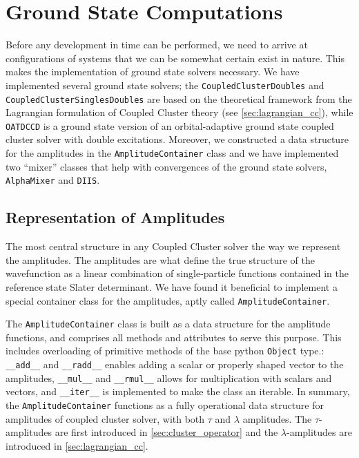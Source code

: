 \section{Ground State Computations}

    Before any development in time can be performed, we need to arrive at configurations 
    of systems that 
    we can be somewhat certain exist in nature. This makes the implementation of ground 
    state solvers necessary. We have implemented several ground state solvers; the
    \lstinline{CoupledClusterDoubles} and \lstinline{CoupledClusterSinglesDoubles} 
    are based on the theoretical framework from the Lagrangian formulation of Coupled 
    Cluster theory (see \autoref{sec:lagrangian_cc}),
    while \lstinline{OATDCCD} is a ground state version of an orbital-adaptive 
    ground state coupled cluster solver with double excitations. Moreover, we constructed 
    a data structure for the amplitudes in the \lstinline{AmplitudeContainer} class and 
    we have implemented two ``mixer'' classes that help with convergences of the ground
    state solvers, \lstinline{AlphaMixer} and \lstinline{DIIS}.

    \begin{figure}[h]
    
    \end{figure}

    \subsection{Representation of Amplitudes}

    The most central structure in any Coupled Cluster solver the way we represent
    the amplitudes. The 
    amplitudes are what define the true structure of the wavefunction as a linear 
    combination of single-particle functions contained in the reference state Slater 
    determinant. We have found it beneficial to implement a special container 
    class for the amplitudes, aptly called \lstinline{AmplitudeContainer}.

    The \lstinline{AmplitudeContainer} class is built as a data structure for 
    the amplitude functions, and comprises all methods and attributes to serve this 
    purpose. This includes overloading of primitive methods of the base 
    python \lstinline{Object} type.: \lstinline{__add__} and \lstinline{__radd__}
    enables adding a scalar or properly shaped vector to the amplitudes, 
    \lstinline{__mul__} and \lstinline{__rmul__} allows for multiplication 
    with scalars and vectors, and \lstinline{__iter__} is implemented to make 
    the class an iterable. In summary, the \lstinline{AmplitudeContainer} 
    functions as a fully operational data structure for amplitudes of coupled 
    cluster solver, with both $\tau$ and $\lambda$ amplitudes. The $\tau$-amplitudes
    are first introduced in \ref{sec:cluster_operator} and the $\lambda$-amplitudes 
    are introduced in \ref{sec:lagrangian_cc}. 

